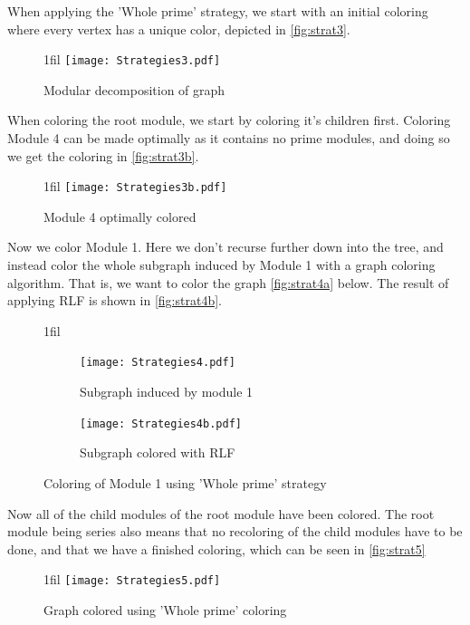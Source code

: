 \documentclass[a4paper]{article}
\makeatletter
\newcommand*{\centerfloat}{%
  \parindent \z@
  \leftskip \z@ \@plus 1fil \@minus \textwidth
  \rightskip\leftskip
  \parfillskip \z@skip}
\makeatother
\begin{document}
When applying the 'Whole prime' strategy, we start with an initial coloring 
where every vertex has a unique color, depicted in \autoref{fig:strat3}.

\begin{figure}[H]
    \centerfloat
    \texttt{[image: Strategies3.pdf]}
    \caption{Modular decomposition of graph}
    \label{fig:strat3}
\end{figure}

When coloring the root module, we start by coloring it's children first.
Coloring Module 4 can be made optimally as it contains no prime modules, and
doing so we get the coloring in \autoref{fig:strat3b}.

\begin{figure}[H]
    \centerfloat
    \texttt{[image: Strategies3b.pdf]}
    \caption{Module 4 optimally colored}
    \label{fig:strat3b}
\end{figure}

Now we color Module 1. Here we don't recurse further down into the tree, and
instead color the whole subgraph induced by Module 1 with a graph coloring
algorithm. That is, we want to color the graph \autoref{fig:strat4a} below.
The result of applying RLF is shown in \autoref{fig:strat4b}.

\begin{figure}[H]
\centerfloat
    \begin{subfigure}{.4\textwidth}
        \texttt{[image: Strategies4.pdf]}
      \caption{Subgraph induced by module 1}
      \label{fig:strat4a}
    \end{subfigure}%
    \begin{subfigure}{.4\textwidth}
        \texttt{[image: Strategies4b.pdf]}
      \caption{Subgraph colored with RLF}
      \label{fig:strat4b}
    \end{subfigure}
\caption{Coloring of Module 1 using 'Whole prime' strategy}
\label{fig:strat4}
\end{figure}

Now all of the child modules of the root module have been colored. The root
module being series also means that no recoloring of the child modules have to
be done, and that we have a finished coloring, which can be seen in
\autoref{fig:strat5}
\begin{figure}[H]
    \centerfloat
    \texttt{[image: Strategies5.pdf]}
    \caption{Graph colored using 'Whole prime' coloring}
    \label{fig:strat5}
\end{figure}
\FloatBarrier
\end{document}

